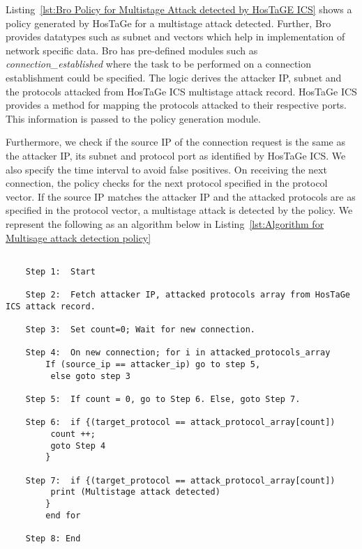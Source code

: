 \documentclass[article,msc=informatik,type=msc,colorback,accentcolor=tud9c]{tudthesis}
\begin{document}
	
	\vspace{3mm}
	Listing~\ref{lst:Bro Policy for Multistage Attack detected by HosTaGE ICS} shows a policy generated by HosTaGe for a multistage attack detected.  Further, Bro provides datatypes such as subnet and vectors which help in implementation of network specific data. Bro has pre-defined modules such as \textit{connection\_established} where the task to be performed on a connection establishment could be specified. The logic derives the attacker \ac{IP}, subnet and the protocols attacked from HosTaGe ICS multistage attack record. HosTaGe ICS provides a method for mapping the protocols attacked to their respective ports. This information is passed to the policy generation module. 


	\vspace{3mm}
	Furthermore, we check if the source \ac{IP} of the connection request is the same as the attacker \ac{IP}, its subnet and protocol port as identified by HosTaGe ICS. We also specify the time interval to avoid false positives. On receiving the next connection, the policy checks for the next protocol specified in the protocol vector. If the source \ac{IP} matches the attacker \ac{IP} and the attacked protocols are as specified in the protocol vector, a multistage attack is detected by the policy.  We represent the following as an algorithm below in Listing~\ref{lst:Algorithm for Multisage attack detection policy}
	
	
	\begin{lstlisting}[caption=Algorithm for Multisage attack detection policy,label=lst:Algorithm for Multisage attack detection policy]
	
	Step 1:  Start
	
	Step 2:  Fetch attacker IP, attacked protocols array from HosTaGe ICS attack record.
		
	Step 3:  Set count=0; Wait for new connection.
		
	Step 4:  On new connection; for i in attacked_protocols_array
		If (source_ip == attacker_ip) go to step 5, 
		 else goto step 3
	
	Step 5:  If count = 0, go to Step 6. Else, goto Step 7.
		
	Step 6:  if {(target_protocol == attack_protocol_array[count])
		 count ++;
		 goto Step 4	
		}
	
	Step 7:  if {(target_protocol == attack_protocol_array[count])
		 print (Multistage attack detected)	
		}
		end for
	
	Step 8: End
	
	
	\end{lstlisting}
	
\end{document}
